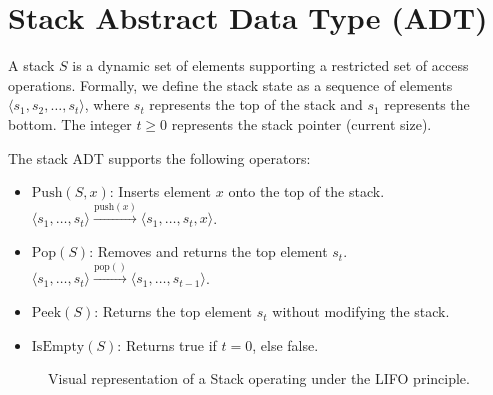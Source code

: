 \documentclass[10pt,journal,compsoc,onecolumn]{IEEEtran}
\begin{document}
\section{Stack Abstract Data Type (ADT)}
A stack $S$ is a dynamic set of elements supporting a restricted set of access operations. Formally, we define the stack state as a sequence of elements $\langle s_1, s_2, \ldots, s_t \rangle$, where $s_t$ represents the top of the stack and $s_1$ represents the bottom. The integer $t \ge 0$ represents the stack pointer (current size).

The stack ADT supports the following operators:
\begin{itemize}
    \item $\mathrm{Push}(S, x)$: Inserts element $x$ onto the top of the stack.
    $\langle s_1, \ldots, s_t \rangle \xrightarrow{\mathrm{push}(x)} \langle s_1, \ldots, s_t, x \rangle$.
    \item $\mathrm{Pop}(S)$: Removes and returns the top element $s_t$.
    $\langle s_1, \ldots, s_t \rangle \xrightarrow{\mathrm{pop}()} \langle s_1, \ldots, s_{t-1} \rangle$.
    \item $\mathrm{Peek}(S)$: Returns the top element $s_t$ without modifying the stack.
    \item $\mathrm{IsEmpty}(S)$: Returns true if $t = 0$, else false.
\end{itemize}

\begin{figure}[htbp]
\centering
{}
\caption{Visual representation of a Stack operating under the LIFO principle.}
\label{fig:stack}
\end{figure}
\end{document}
